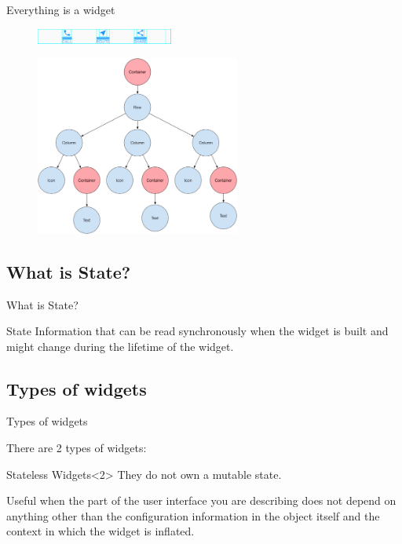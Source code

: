 \begin{frame}{Everything is a widget}
    \begin{figure}[h]
        \includegraphics[width=0.4\textwidth]{images/lakes-icons-visual.png}
    \end{figure}
    \begin{figure}[h]
        \includegraphics[width=0.6\textwidth]{images/sample-flutter-layout.png}
    \end{figure}
\end{frame}

\subsection{What is State?}

\begin{frame}{What is State?}
    \begin{block}{State}
        Information that can be read synchronously when the widget is built and might change during the lifetime of the widget.
    \end{block}
\end{frame}

\subsection{Types of widgets}
\begin{frame}{Types of widgets}

There are 2 types of widgets:

\begin{block}{Stateless Widgets}<2>
    They do not own a mutable state.

    Useful when the part of the user interface you are describing does not depend on anything other than the configuration information in the object itself and the context in which the widget is inflated.
\end{block}
    
\end{frame}

